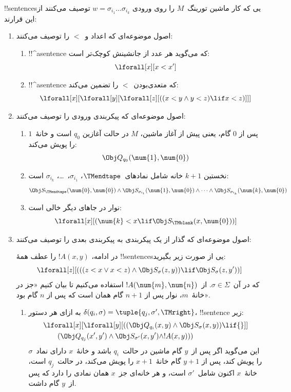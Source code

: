 \documentclass[../../../include/open-logic-section]{subfiles}
\begin{document}
!!{sentence}sیی که کار ماشین تورینگ~$M$ را روی ورودی
$w=\sigma_{i_1}\dots\sigma_{i_k}$ توصیف می‌کنند از این قرارند:
\begin{enumerate}
\item اصول موضوعه‌ای که اعداد و~$<$ را توصیف می‌کنند:
\begin{enumerate}
\item !!^a{sentence} که می‌گوید هر عدد از جانشینش کوچک‌تر است:
\[
\lforall[x][x < x']
\]
\item !!^a{sentence} که متعدی‌بودن~$<$ را تضمین می‌کند:
\[
\lforall[x][\lforall[y][\lforall[z][
      ((x < y \land y < z) \lif x < z)]]]
\]
\end{enumerate}
\item اصول موضوعه‌ای که پیکربندی ورودی را توصیف می‌کنند:
\begin{enumerate}
\item پس از $0$ گام، یعنی پیش از آغاز ماشین، $M$ در حالت آغازین
  $q_0$ است و خانهٔ~$1$ را پویش می‌کند:
\[
\Obj Q_{q_0}(\num{1}, \num{0})
\]
\item نخستین $k+1$ خانه شامل نمادهای~$\TMendtape$،
  $\sigma_{i_1}$،~\dots، $\sigma_{i_k}$ است:
\[
\Obj S_\TMendtape(\num{0}, \num{0}) \land
\Obj S_{\sigma_{i_1}}(\num{1}, \num{0}) \land
\dots \land
\Obj S_{\sigma_{i_k}}(\num{k}, \num{0})
\]
\item نوار در جاهای دیگر خالی است:
\[
\lforall[x][(\num{k} < x \lif \Obj S_\TMblank(x, \num{0}))]
\]
\end{enumerate}
\item اصول موضوعه‌ای که گذار از یک پیکربندی به پیکربندی بعدی را
  توصیف می‌کنند:

در ادامه، $!A(x,y)$ را عطف همهٔ !!{sentence}sیی از صورت زیر بگیرید:
\[
\lforall[z][
  (((z < x \lor x < z) \land \Obj S_\sigma(z, y))
  \lif \Obj S_\sigma(z, y'))]
\]
که در آن~$\sigma\in\Sigma$. از~$!A(\num{m},\num{n})$ استفاده می‌کنیم
تا بیان کنیم «جز در خانهٔ~$m$، نوار پس از $n+1$ گام همان است که پس
از $n$ گام بود».
\begin{enumerate}
\item {} به ازای هر دستور
  $\delta(q_i,\sigma)=\tuple{q_j,\sigma',\TMright}$، !!{sentence}ٔ زیر:
\begin{align*}
& \lforall[x][\lforall[y][(
   (\Obj Q_{q_i}(x, y) \land \Obj S_{\sigma}(x, y)) \lif {}]] \\
&\qquad   (\Obj Q_{q_j}(x', y') \land \Obj S_{\sigma'}(x, y') \land
!A(x, y)))
\end{align*}
این می‌گوید اگر پس از~$y$ گام ماشین در حالت~$q_i$ باشد و خانهٔ~$x$
دارای نماد~$\sigma$ را پویش کند، پس از $y+1$ گام خانهٔ~$x+1$ را پویش
می‌کند، در حالت~$q_j$ است، خانهٔ~$x$ اکنون شامل~$\sigma'$ است، و هر
خانه‌ای جز~$x$ همان نمادی را دارد که پس از~$y$ گام داشت.


\end{enumerate}
\end{enumerate}
\end{document}
